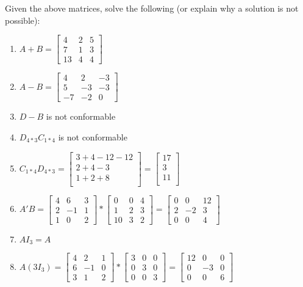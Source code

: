 \documentclass [12pt] {article}
\begin{document}
\bigskip Given the above matrices, solve the following (or explain why a solution is not possible):
\bigskip
\begin{enumerate}
    \item $A+B =  \begin{bmatrix}  4&2&5\\7&1&3\\13&4&4 \end{bmatrix} $
    \item $A-B = \begin{bmatrix}
        4&2&-3\\5&-3&-3\\-7&-2&0
    \end{bmatrix}$
    \item $D-B $ is not conformable
   \item $D_{4*3}C_{1*4}$ is not conformable
    \item $C_{1*4}D_{4*3}= \begin{bmatrix}
       3+4-12-12 \\2+4-3 \\ 1+2+8\\
    \end{bmatrix} = \begin{bmatrix}
       17 \\3 \\ 11\\
    \end{bmatrix}$
    \item $A'B= \begin{bmatrix}
        4&6&3\\2&-1&1\\1&0&2
    \end{bmatrix} * 
    \begin{bmatrix}
    0&0&4\\ 1&2&3 \\ 10&3&2
\end{bmatrix} 
= \begin{bmatrix}
   0&0&12\\2&-2&3\\0&0&4 
\end{bmatrix}
$
    \item $AI_3=A$
    \item $A(3I_3)= \begin{bmatrix}
            4 &2&1\\ 6&-1&0\\ 3&1&2
\end{bmatrix}
    *
     \begin{bmatrix}
            3 &0&0\\ 0&3&0\\ 0&0&3
    \end{bmatrix} 
    = 
    \begin{bmatrix}
            12 &0&0\\ 0&-3&0\\ 0&0&6
    \end{bmatrix} 
    $

\end{enumerate}
\end{document}
